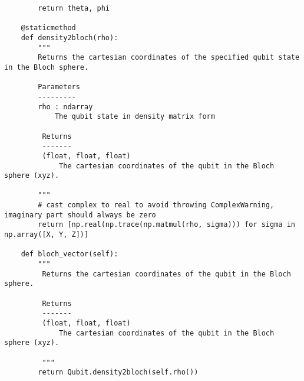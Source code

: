 \begin{verbatim}
        return theta, phi

    @staticmethod
    def density2bloch(rho):
        """
        Returns the cartesian coordinates of the specified qubit state in the Bloch sphere.

        Parameters
        ---------
        rho : ndarray
            The qubit state in density matrix form

         Returns
         -------
         (float, float, float)
             The cartesian coordinates of the qubit in the Bloch sphere (xyz).

        """
        # cast complex to real to avoid throwing ComplexWarning, imaginary part should always be zero
        return [np.real(np.trace(np.matmul(rho, sigma))) for sigma in np.array([X, Y, Z])]

    def bloch_vector(self):
        """
         Returns the cartesian coordinates of the qubit in the Bloch sphere.

         Returns
         -------
         (float, float, float)
             The cartesian coordinates of the qubit in the Bloch sphere (xyz).

         """
        return Qubit.density2bloch(self.rho())
\end{verbatim}
\newpage
